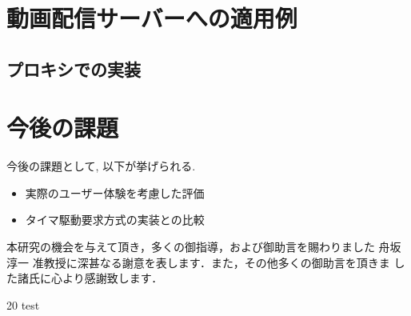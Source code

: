 \documentclass[a4j,12pt]{gradthesis_utf8}
\begin{document}
\chapter{動画配信サーバーへの適用例}
\section{プロキシでの実装}
 
\chapter{今後の課題}\label{sec:sec7}
\hspace*{0.5em}今後の課題として, 以下が挙げられる.
\begin{itemize}
	\item 実際のユーザー体験を考慮した評価
	\item タイマ駆動要求方式の実装との比較
\end{itemize}
\clearpage
%
\begin{acknowledgment}
 本研究の機会を与えて頂き，多くの御指導，および御助言を賜わりました
舟坂 淳一 准教授に深甚なる謝意を表します．また，その他多くの御助言を頂きま
した諸氏に心より感謝致します．
\end{acknowledgment}
\begin {thebibliography}{20} 
 test

\end {thebibliography}
\end{document}
